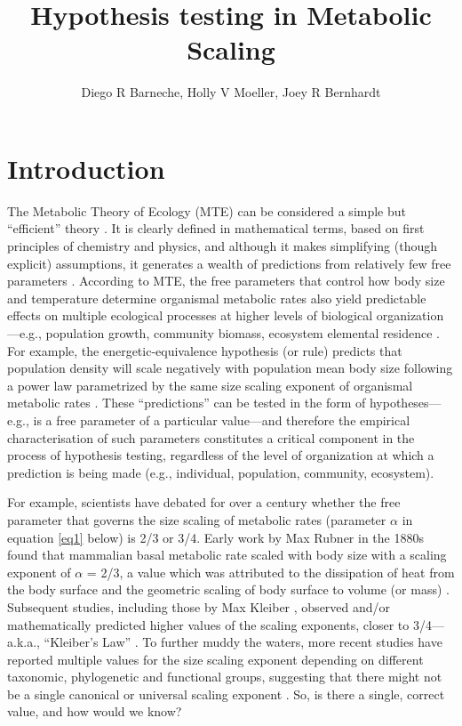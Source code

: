\documentclass[a4paper,12pt]{article}
\title{Hypothesis testing in Metabolic Scaling}
\author{Diego R Barneche, Holly V Moeller, Joey R Bernhardt}
\begin{document}
\maketitle

\section{Introduction}

The Metabolic Theory of Ecology (MTE) can be considered a simple but ``efficient'' theory \citep{marquet2014bioscience}. It is clearly defined in mathematical terms, based on first principles of chemistry and physics, and although it makes simplifying (though explicit) assumptions, it generates a wealth of predictions from relatively few free parameters \citep{marquet2014bioscience, brown2004ecology}. According to MTE, the free parameters that control how body size and temperature determine organismal metabolic rates also yield predictable effects on multiple ecological processes at higher levels of biological organization---e.g., population growth, community biomass, ecosystem elemental residence \citep{brown2004ecology, savage2004amnat, allen2005functecol, barneche2014ele, schramski2015pnas}. For example, the energetic-equivalence hypothesis (or rule) predicts that population density will scale negatively with population mean body size following a power law parametrized by the same size scaling exponent of organismal metabolic rates \citep{wright1983oikos, allen2002science, barneche2016procb}. These ``predictions'' can be tested in the form of hypotheses---e.g., is a free parameter of a particular value---and therefore the empirical characterisation of such parameters constitutes a critical component in the process of hypothesis testing, regardless of the level of organization at which a prediction is being made (e.g., individual, population, community, ecosystem).

For example, scientists have debated for over a century whether the free parameter that governs the size scaling of metabolic rates (parameter $\alpha$ in equation \ref{eq1} below) is 2/3 or 3/4. Early work by Max Rubner in the 1880s found that mammalian basal metabolic rate scaled with body size with a scaling exponent of $\alpha$ = 2/3, a value which was attributed to the dissipation of heat from the body surface and the geometric scaling of body surface to volume (or mass) \citep{rubner1883zeibiol}. Subsequent studies, including those by Max Kleiber \citeyearpar{kleiber1932hilgardia}, observed and/or mathematically predicted higher values of the scaling exponents, closer to 3/4---a.k.a., ``Kleiber's Law'' \citep{west1997science, west1999science}. To further muddy the waters, more recent studies have reported multiple values for the size scaling exponent depending on different taxonomic, phylogenetic and functional groups, suggesting that there might not be a single canonical or universal scaling exponent \citep[e.g.,][]{white2003pnas, white2005jeb, delong2010pnas}\citep[but see][for recent extensions of theoretical predictions]{brummer2017plosbiol}. So, is there a single, correct value, and how would we know?
\end{document}
